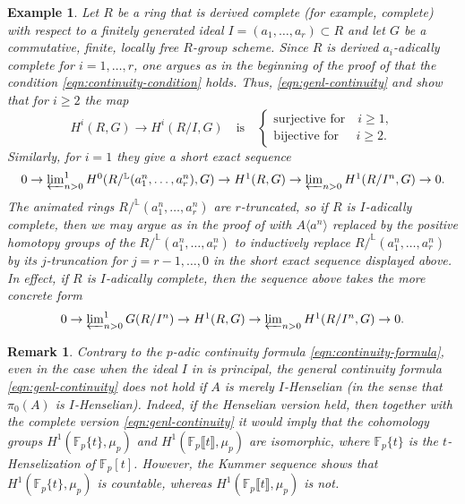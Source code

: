 \documentclass[11pt, reqno]{amsart}
\newcommand{\bF}{\mathbb{F}}
\newcommand{\bL}{\mathbb{L}}
\newcommand{\llb}{\llbracket}			%
\newcommand{\ra}{\rightarrow}
\newcommand{\rrb}{\rrbracket}			%
\newcommand{\beg}{\begin{eg}}
\newcommand{\eeg}{\end{eg}}
\providecommand{\qxq}[1]{\quad\text{#1}\quad}
\providecommand{\xq}[1]{\text{#1}\quad}
\newcommand{\tst}{\textstyle}
\newcommand{\be}{\begin{equation}}
\newcommand{\ee}{\end{equation}}
\newcommand{\brem}{\begin{rem}}
\newcommand{\erem}{\end{rem}}
\numberwithin{equation}{numberingbase}
\theoremstyle{thms}
\theoremstyle{claims}
\theoremstyle{defs}
\newtheorem{eg}[numberingbase]{Example}
\newtheorem{rem}[numberingbase]{Remark}
\theoremstyle{thms}
\theoremstyle{defs}
\theoremstyle{subsection-tweak}
\theoremstyle{subsection-tweak}
\begin{document}
\beg \label{eg:continuity}
Let $R$ be a ring that is derived complete (for example, complete) with respect to a finitely generated ideal $I = (a_1, \dotsc, a_r) \subset R$ and let $G$ be a commutative, finite, locally free $R$-group scheme. Since $R$ is derived $a_i$-adically complete for $i = 1, \dotsc, r$, one argues as in the beginning of the proof of  that the condition \eqref{eqn:continuity-condition} holds. Thus, \eqref{eqn:genl-continuity} and  show that for $i \ge 2$ the map
\be \label{eqn:derived-prelim-case}
H^i(R, G) \ra H^i(R/I, G) \qxq{is} \begin{cases}\xq{surjective for} i \ge 1, \\ \xq{bijective for}\ \, i \ge 2.  \end{cases}
\ee
Similarly, for $i = 1$ they give a short exact sequence
\[
\tst 0 \ra \varprojlim^1_{n > 0} H^{0}(R/^\bL(a_1^n, \dotsc, a_r^n), G) \ra H^1(R, G) \ra \varprojlim_{n > 0} H^1(R/I^n, G) \ra 0.
\]
The animated rings $R/^\bL(a_1^n, \dotsc, a_r^n)$ are $r$-truncated, so if $R$ is $I$-adically complete, then we may argue as in the proof of  with $A\langle a^n\rangle$ replaced by the positive homotopy groups of the $R/^\bL(a_1^n, \dotsc, a_r^n)$ to inductively replace $R/^\bL(a_1^n, \dotsc, a_r^n)$ by its $j$-truncation for $j = r - 1, \dotsc, 0$ in the short exact sequence displayed above. In effect, if $R$ is $I$-adically complete, then the sequence above takes the more concrete form
\[
\tst 0 \ra \varprojlim^1_{n > 0} G(R/I^n) \ra H^1(R, G) \ra \varprojlim_{n > 0} H^1(R/I^n, G) \ra 0.
\]
\eeg









\brem
Contrary to the $p$-adic continuity formula \eqref{eqn:continuity-formula}, even in the case when the ideal $I$ in  is principal, the general continuity formula \eqref{eqn:genl-continuity} does not hold if $A$ is merely $I$-Henselian (in the sense that $\pi_0(A)$ is $I$-Henselian). Indeed, if the Henselian version held, then together with the complete version \eqref{eqn:genl-continuity} it would imply that the cohomology groups $H^1(\bF_p\{t\}, \mu_p)$ and $H^1(\bF_p\llb t \rrb, \mu_p)$ are isomorphic, where $\bF_p\{t\}$ is the $t$-Henselization of $\bF_p[t]$. However, the Kummer sequence shows that $H^1(\bF_p\{t\}, \mu_p)$ is countable, whereas $H^1(\bF_p\llb t \rrb, \mu_p)$ is not.
\erem
\end{document}
